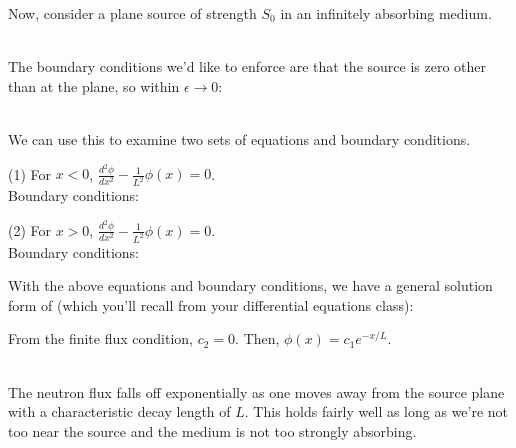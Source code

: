 \documentclass[12pt]{article}
\newif\ifeqns
\newcommand{\rvec}{\ensuremath{\vec{r}}}
\begin{document}
Now, consider a plane source of strength $S_0$ in an infinitely absorbing medium.
\ifeqns
\begin{align*}
\phi(\rvec) &= \phi(x)\\
%
\frac{d^2\phi(x)}{dx^2} &- \frac{1}{L^2}\phi(x) = -\frac{S_0\delta(x)}{D}
\end{align*}
\else
\vspace*{6em}\\
\fi
The boundary conditions we'd like to enforce are that the source is zero other than at the plane, so within $\epsilon \rightarrow 0$:
%
\ifeqns
\[-D \frac{d \phi}{dx}|_{+\epsilon} + D \frac{d \phi}{dx}|_{-\epsilon} = 
J_x(0^+) - J_x(0^-) = S_0\:.\]
\else
\vspace*{3em}\\
\fi
%
We can use this to examine two sets of equations and boundary conditions.


(1) For $x < 0$, $\frac{d^2\phi}{dx^2} - \frac{1}{L^2}\phi(x) = 0$.\\
%
Boundary conditions: 
\ifeqns
\begin{align*}
&\lim\limits_{x\rightarrow 0^+}\vec{J}(x) = \frac{S_0}{2}, \: \\
%
&\lim\limits_{x\rightarrow +\infty}|\phi(x)|<\infty, \: \phi(x) \geq 0
\end{align*}
\else
\vspace*{5em}
\fi

(2) For $x > 0$, \: $\frac{d^2\phi}{dx^2} - \frac{1}{L^2}\phi(x) = 0$.\\
%
Boundary conditions: 
\ifeqns
\begin{align*}
&\lim\limits_{x\rightarrow 0^-}\vec{J}(x) = -\frac{S_0}{2}\:, \\
%
&\lim\limits_{x\rightarrow -\infty}|\phi(x)|<\infty, \phi(x) \geq 0
\end{align*}
\else
\vspace*{5em}
\fi


With the above equations and boundary conditions, we have a general solution form of (which you'll recall from your differential equations class):
%
\ifeqns
\begin{equation*}
\phi(x) = c_1e^{-x/L} + c_2e^{x/L}.
\end{equation*}
\else
\vspace*{3em}
\fi

From the finite flux condition, $c_2 = 0$. Then, $\phi(x) = c_1e^{-x/L}$.
\ifeqns
\begin{align*}
\lim\limits_{x\to 0^+} \vec{J}(x) &= \lim\limits_{x\to 0^+}\left(\frac{D}{L}c_1e^{-x/L}\right) = 
\frac{D}{L}c_1 = \frac{S_0}{2}\\
%
c_1 &= \frac{S_0 L}{2D}\\
%
\phi(x) &= \boxed{\frac{S_0L}{2D}e^{-x/L}}
\end{align*}
\else
\vspace*{9em}\\
\fi
The neutron flux falls off exponentially as one moves away from the source plane with a characteristic decay length of $L$. This holds fairly well as long as we're not too near the source and the medium is not too strongly absorbing.
\end{document}
